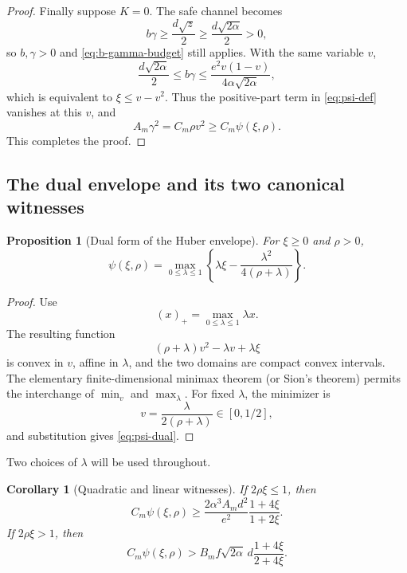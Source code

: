 \documentclass[11pt]{article}
\newtheorem{proposition}[theorem]{Proposition}
\newtheorem{corollary}[theorem]{Corollary}
\newcommand{\pos}[1]{\left(#1\right)_{+}}
\begin{document}
\begin{proof}
Finally suppose \(K=0\).  The safe channel becomes
\[
       b\gamma\ge\frac{d\sqrt z}{2}
       \ge\frac{d\sqrt{2\alpha}}2>0,
\]
so \(b,\gamma>0\) and \eqref{eq:b-gamma-budget} still applies.  With the
same variable \(v\),
\[
 \frac{d\sqrt{2\alpha}}2
 \le b\gamma
 \le\frac{e^2v(1-v)}{4\alpha\sqrt{2\alpha}},
\]
which is equivalent to \(\xi\le v-v^2\).  Thus the positive-part term in
\eqref{eq:psi-def} vanishes at this \(v\), and
\[
       A_m\gamma^2=C_m\rho v^2\ge C_m\psi(\xi,\rho).
\]
This completes the proof.
\end{proof}

\subsection{The dual envelope and its two canonical witnesses}

\begin{proposition}[Dual form of the Huber envelope]\label{prop:huber-dual}
For \(\xi\ge0\) and \(\rho>0\),
\begin{equation}\label{eq:psi-dual}
       \psi(\xi,\rho)=
       \max_{0\le\lambda\le1}
       \left\{
       \lambda\xi-\frac{\lambda^2}{4(\rho+\lambda)}
       \right\}.
\end{equation}
\end{proposition}

\begin{proof}
Use
\[
       \pos x=\max_{0\le\lambda\le1}\lambda x.
\]
The resulting function
\[
       (\rho+\lambda)v^2-\lambda v+\lambda\xi
\]
is convex in \(v\), affine in \(\lambda\), and the two domains are compact
convex intervals.  The elementary finite-dimensional minimax theorem (or
Sion's theorem) permits the interchange of \(\min_v\) and \(\max_\lambda\).
For fixed \(\lambda\), the minimizer is
\[
       v=\frac{\lambda}{2(\rho+\lambda)}\in[0,1/2],
\]
and substitution gives \eqref{eq:psi-dual}.
\end{proof}

Two choices of \(\lambda\) will be used throughout.

\begin{corollary}[Quadratic and linear witnesses]\label{cor:two-witnesses}
If \(2\rho\xi\le1\), then
\begin{equation}\label{eq:witness-quadratic}
 C_m\psi(\xi,\rho)
 \ge
 \frac{2\alpha^3A_md^2}{e^2}
 \frac{1+4\xi}{1+2\xi}.
\end{equation}
If \(2\rho\xi>1\), then
\begin{equation}\label{eq:witness-linear}
 C_m\psi(\xi,\rho)
 >B_mf\sqrt{2\alpha}\,d
 \frac{1+4\xi}{2+4\xi}.
\end{equation}
\end{corollary}
\end{document}
